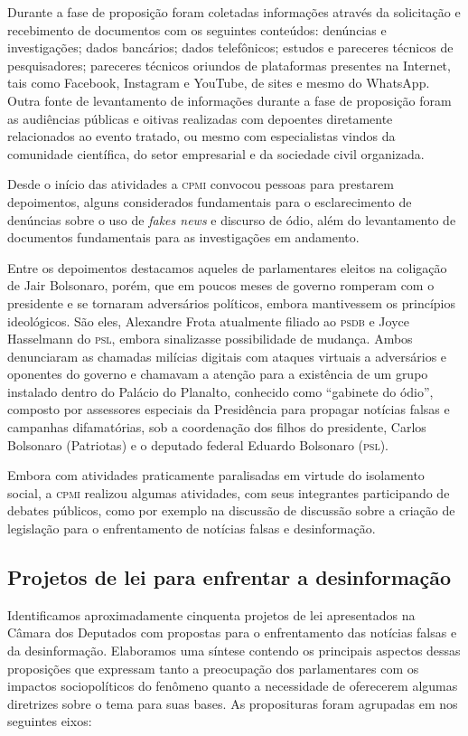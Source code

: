 Durante a fase de proposição foram coletadas informações através da
solicitação e recebimento de documentos com os seguintes conteúdos:
denúncias e investigações; dados bancários; dados telefônicos; estudos e
pareceres técnicos de pesquisadores; pareceres técnicos oriundos de
plataformas presentes na Internet, tais como Facebook, Instagram e
YouTube, de sites e mesmo do WhatsApp. Outra fonte de levantamento de
informações durante a fase de proposição foram as audiências públicas e
oitivas realizadas com depoentes diretamente relacionados ao evento
tratado, ou mesmo com especialistas vindos da comunidade científica, do
setor empresarial e da sociedade civil organizada.

Desde o início das atividades a \textsc{cpmi} convocou pessoas para prestarem
depoimentos, alguns considerados fundamentais para o esclarecimento de
denúncias sobre o uso de \textit{fakes news} e discurso de ódio, além do
levantamento de documentos fundamentais para as investigações em
andamento.

Entre os depoimentos destacamos aqueles de parlamentares eleitos na
coligação de Jair Bolsonaro, porém, que em poucos meses de governo
romperam com o presidente e se tornaram adversários políticos, embora
mantivessem os princípios ideológicos. São eles, Alexandre Frota
atualmente filiado ao \textsc{psdb} e Joyce Hasselmann do \textsc{psl}, embora
sinalizasse possibilidade de mudança. Ambos denunciaram as chamadas
milícias digitais com ataques virtuais a adversários e oponentes do
governo e chamavam a atenção para a existência de um grupo instalado
dentro do Palácio do Planalto, conhecido como ``gabinete do ódio'',
composto por assessores especiais da Presidência para propagar notícias
falsas e campanhas difamatórias, sob a coordenação dos filhos do
presidente, Carlos Bolsonaro (Patriotas) e o deputado federal Eduardo
Bolsonaro (\textsc{psl}).

Embora com atividades praticamente paralisadas em virtude do isolamento
social, a \textsc{cpmi} realizou algumas atividades, com seus integrantes
participando de debates públicos, como por exemplo na discussão de
discussão sobre a criação de legislação para o enfrentamento de notícias
falsas e desinformação.

\subsection{Projetos de lei para enfrentar a desinformação}

Identificamos aproximadamente cinquenta projetos de lei apresentados na
Câmara dos Deputados com propostas para o enfrentamento das notícias
falsas e da desinformação. Elaboramos uma síntese contendo os principais
aspectos dessas proposições que expressam tanto a preocupação dos
parlamentares com os impactos sociopolíticos do fenômeno quanto a
necessidade de oferecerem algumas diretrizes sobre o tema para suas
bases. As proposituras foram agrupadas em nos seguintes eixos:

